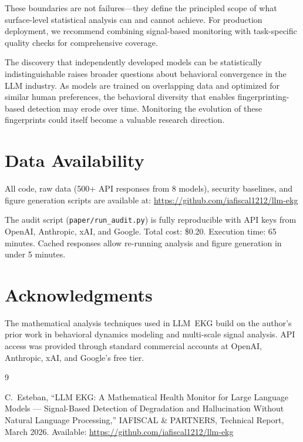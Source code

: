 \documentclass[11pt,twocolumn]{article}
\begin{document}
These boundaries are not failures---they define the principled scope of what surface-level statistical analysis can and cannot achieve.
For production deployment, we recommend combining signal-based monitoring with task-specific quality checks for comprehensive coverage.

The discovery that independently developed models can be statistically indistinguishable raises broader questions about behavioral convergence in the LLM industry.
As models are trained on overlapping data and optimized for similar human preferences, the behavioral diversity that enables fingerprinting-based detection may erode over time.
Monitoring the evolution of these fingerprints could itself become a valuable research direction.

\section*{Data Availability}

All code, raw data (500+ API responses from 8 models), security baselines, and figure generation scripts are available at: \url{https://github.com/iafiscal1212/llm-ekg}

The audit script (\texttt{paper/run\_audit.py}) is fully reproducible with API keys from OpenAI, Anthropic, xAI, and Google.
Total cost: \$0.20.
Execution time: 65 minutes.
Cached responses allow re-running analysis and figure generation in under 5 minutes.

\section*{Acknowledgments}

The mathematical analysis techniques used in LLM~EKG build on the author's prior work in behavioral dynamics modeling and multi-scale signal analysis.
API access was provided through standard commercial accounts at OpenAI, Anthropic, xAI, and Google's free tier.

\begin{thebibliography}{9}

C.~Esteban, ``LLM EKG: A Mathematical Health Monitor for Large Language Models --- Signal-Based Detection of Degradation and Hallucination Without Natural Language Processing,'' IAFISCAL \& PARTNERS, Technical Report, March 2026. Available: \url{https://github.com/iafiscal1212/llm-ekg}

\end{thebibliography}
\end{document}
